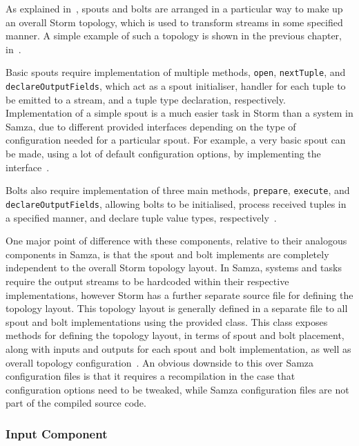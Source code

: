 As explained in~, spouts and bolts are arranged in a particular way to make up an overall Storm topology,
which is used to transform streams in some specified manner. A simple example of such a topology is shown in the previous
chapter, in~.

Basic spouts require implementation of multiple methods, \texttt{open}, \texttt{nextTuple}, and \texttt{declareOutputFields},
which act as a spout initialiser, handler for each tuple to be emitted to a stream, and a tuple type declaration, respectively.
Implementation of a simple spout is a much easier task in Storm than a system in Samza, due to different provided interfaces
depending on the type of configuration needed for a particular spout. For example, a very basic spout can be made, using
a lot of default configuration options, by implementing the  interface~\cite{storm_doc}.

Bolts also require implementation of three main methods, \texttt{prepare}, \texttt{execute}, and \texttt{declareOutputFields},
allowing bolts to be initialised, process received tuples in a specified manner, and declare tuple value types, respectively~\cite{storm_doc}.

One major point of difference with these components, relative to their analogous components in Samza, is that the spout and bolt
implements are completely independent to the overall Storm topology layout. In Samza, systems and tasks require the output
streams to be hardcoded within their respective implementations, however Storm has a further separate source file for
defining the topology layout. This topology layout is generally defined in a separate file to all spout and bolt implementations
using the provided  class. This class exposes methods for defining the
topology layout, in terms of spout and bolt placement, along with inputs and outputs for each spout and bolt implementation,
as well as overall topology configuration~\cite{storm_doc}. An obvious downside to this over Samza configuration files is that it requires
a recompilation in the case that configuration options need to be tweaked, while Samza configuration files are not part
of the compiled source code.

\subsubsection{Input Component}

